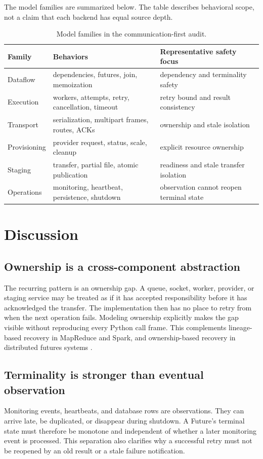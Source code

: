 \documentclass[11pt,a4paper]{article}
\newenvironment{tabularx}[2]{\begin{tabular}{#2}}{\end{tabular}}
\begin{document}
The model families are summarized below. The table describes behavioral scope, not a claim that each
backend has equal source depth.

\begin{table}[h]
\centering
\caption{Model families in the communication-first audit.}
\normalsize
\begin{tabularx}{\textwidth}{>{\raggedright\arraybackslash}p{0.24\textwidth} X X}
\toprule
Family & Behaviors & Representative safety focus \\
\midrule
Dataflow & dependencies, futures, join, memoization & dependency and terminality safety \\
Execution & workers, attempts, retry, cancellation, timeout & retry bound and result consistency \\
Transport & serialization, multipart frames, routes, ACKs & ownership and stale isolation \\
Provisioning & provider request, status, scale, cleanup & explicit resource ownership \\
Staging & transfer, partial file, atomic publication & readiness and stale transfer isolation \\
Operations & monitoring, heartbeat, persistence, shutdown & observation cannot reopen terminal state \\
\bottomrule
\end{tabularx}
\end{table}

\section{Discussion}
\subsection{Ownership is a cross-component abstraction}
The recurring pattern is an ownership gap. A queue, socket, worker, provider, or staging service may
be treated as if it has accepted responsibility before it has acknowledged the transfer. The
implementation then has no place to retry from when the next operation fails. Modeling ownership
explicitly makes the gap visible without reproducing every Python call frame. This complements
lineage-based recovery in MapReduce and Spark, and ownership-based recovery in distributed futures
systems \cite{dean2004mapreduce,zaharia2012resilient,wang2021ownership}.

\subsection{Terminality is stronger than eventual observation}
Monitoring events, heartbeats, and database rows are observations. They can arrive late, be
duplicated, or disappear during shutdown. A Future's terminal state must therefore be monotone and
independent of whether a later monitoring event is processed. This separation also clarifies why a
successful retry must not be reopened by an old result or a stale failure notification.
\end{document}
